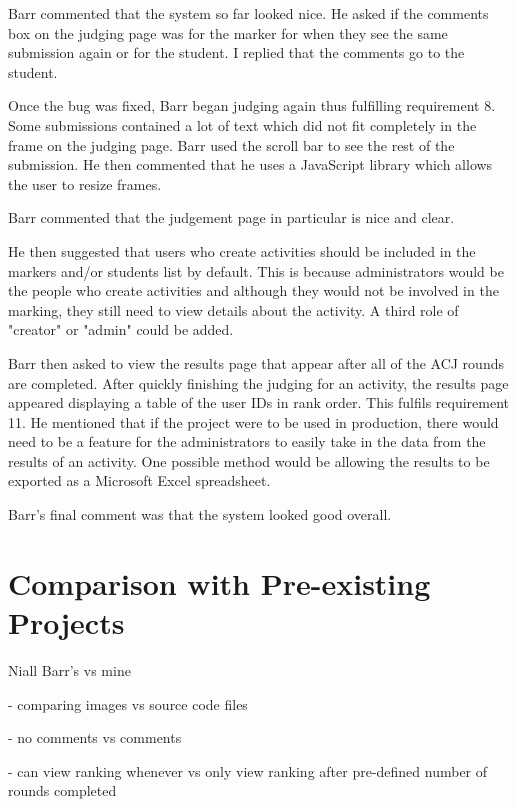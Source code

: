 \documentclass{l4proj}
\begin{document}
Barr commented that the system so far looked nice. He asked if the comments box on the judging page was for the marker for when they see the same submission again or for the student. I replied that the comments go to the student.

Once the bug was fixed, Barr began judging again thus fulfilling requirement 8. Some submissions contained a lot of text which did not fit completely in the frame on the judging page. Barr used the scroll bar to see the rest of the submission. He then commented that he uses a JavaScript library which allows the user to resize frames.

Barr commented that the judgement page in particular is nice and clear.

He then suggested that users who create activities should be included in the markers and/or students list by default. This is because administrators would be the people who create activities and although they would not be involved in the marking, they still need to view details about the activity. A third role of "creator" or "admin" could be added.

Barr then asked to view the results page that appear after all of the ACJ rounds are completed. After quickly finishing the judging for an activity, the results page appeared displaying a table of the user IDs in rank order. This fulfils requirement 11. He mentioned that if the project were to be used in production, there would need to be a feature for the administrators to easily take in the data from the results of an activity. One possible method would be allowing the results to be exported as a Microsoft Excel spreadsheet.

Barr's final comment was that the system looked good overall.


\section{Comparison with Pre-existing Projects}

Niall Barr's vs mine

- comparing images vs source code files

- no comments vs comments

- can view ranking whenever vs only view ranking after pre-defined number of rounds completed


\end{document}
